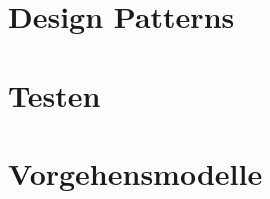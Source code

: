 \documentclass[11pt, a4paper]{article}
\begin{document}
\section{Design Patterns} %


\section{Testen} %


\section{Vorgehensmodelle} %
\end{document}
